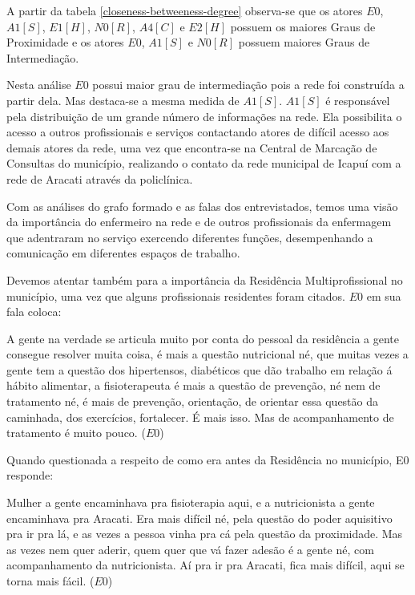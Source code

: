 A partir da tabela \ref{closeness-betweeness-degree} observa-se que os atores $E0$, $A1 [S]$, $E1 [H]$, $N0 [R]$, $A4 [C]$ e $E2 [H]$ possuem os maiores Graus de Proximidade e os atores $E0$, $A1 [S]$ e $N0 [R]$ possuem maiores Graus de Intermediação.

Nesta análise $E0$ possui maior grau de intermediação pois a rede foi construída a partir dela. Mas destaca-se a mesma medida de $A1[S]$. $A1[S]$ é responsável pela distribuição de um grande número de informações na rede. Ela possibilita o acesso a outros profissionais e serviços contactando atores de difícil acesso aos demais atores da rede, uma vez que encontra-se na Central de Marcação de Consultas do município, realizando o contato da rede municipal de Icapuí com a rede de Aracati através da policlínica.

Com as análises do grafo formado e as falas dos entrevistados, temos uma visão da importância do enfermeiro na rede e de outros profissionais da enfermagem que adentraram no serviço exercendo diferentes funções, desempenhando a comunicação  em diferentes espaços de trabalho.

Devemos atentar também para a importância da Residência Multiprofissional no município, uma vez que alguns profissionais residentes foram citados. $E0$ em sua fala coloca:

\begin{citacao}
A gente na verdade se articula muito por conta do pessoal da residência a gente consegue resolver muita coisa, é mais a questão nutricional né, que muitas vezes a gente tem a questão dos hipertensos, diabéticos que dão trabalho em relação á hábito alimentar, a fisioterapeuta é mais a questão de prevenção, né nem de tratamento né, é mais de prevenção, orientação, de orientar essa questão da caminhada, dos exercícios, fortalecer. É mais isso. Mas de acompanhamento de tratamento é muito pouco. ($E0$)
\end{citacao}

Quando questionada a respeito de como era antes da Residência no município, E0 responde:

\begin{citacao}
Mulher a gente encaminhava pra fisioterapia aqui, e a nutricionista a gente encaminhava pra Aracati. Era mais difícil né, pela questão do poder aquisitivo pra ir pra lá, e as vezes a pessoa vinha pra cá pela questão da proximidade. Mas as vezes nem quer aderir, quem quer que vá fazer adesão é a gente né, com acompanhamento da nutricionista. Aí pra ir pra Aracati, fica mais difícil, aqui se torna mais fácil. ($E0$)
\end{citacao}


